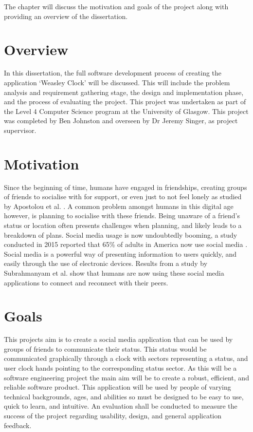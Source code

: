 The chapter will discuss the motivation and goals of the project along with providing an overview of the dissertation.

\section{Overview}

In this dissertation, the full software development process of creating the application `Weasley Clock' will be discussed. This will include the problem analysis and requirement gathering stage, the design and implementation phase, and the process of evaluating the project. This project was undertaken as part of the Level 4 Computer Science program at the University of Glasgow. This project was completed by Ben Johnston and overseen by Dr Jeremy Singer, as project supervisor.

\section{Motivation}
Since the beginning of time, humans have engaged in friendships, creating groups of friends to socialise with for support, or even just to not feel lonely as studied by Apostolou et al. \cite{whyFriends}. A common problem amongst humans in this digital age however, is planning to socialise with these friends. Being unaware of a friend's status or location often presents challenges when planning, and likely leads to a breakdown of plans.  \newline\newline
Social media usage is now undoubtedly booming, a study conducted in 2015 reported that 65\% of adults in America now use social media \cite{socialMediaUsage}. Social media is a powerful way of presenting information to users quickly, and easily through the use of electronic devices. Results from a study by Subrahmanyam et al. \cite{SUBRAHMANYAM2008420} show that humans are now using these social media applications to connect and reconnect with their peers.


\section{Goals}
This projects aim is to create a social media application that can be used by groups of friends to communicate their status. This status would be communicated graphically through a clock with sectors representing a status, and user clock hands pointing to the corresponding status sector. As this will be a software engineering project the main aim will be to create a robust, efficient, and reliable software product. This application will be used by people of varying technical backgrounds, ages, and abilities so must be designed to be easy to use, quick to learn, and intuitive. An evaluation shall be conducted to measure the success of the project regarding usability, design, and general application feedback.

